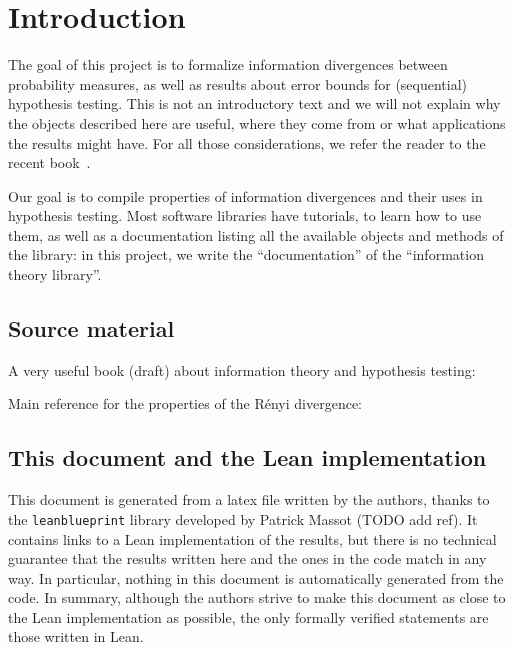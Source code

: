 \chapter*{Introduction}

The goal of this project is to formalize information divergences between probability measures, as well as results about error bounds for (sequential) hypothesis testing.
This is not an introductory text and we will not explain why the objects described here are useful, where they come from or what applications the results might have. For all those considerations, we refer the reader to the recent book~\cite{polyanskiy2024information}.

Our goal is to compile properties of information divergences and their uses in hypothesis testing. Most software libraries have tutorials, to learn how to use them, as well as a documentation listing all the available objects and methods of the library: in this project, we write the ``documentation'' of the ``information theory library''.


\section*{Source material}

A very useful book (draft) about information theory and hypothesis testing: \cite{polyanskiy2024information} 

Main reference for the properties of the Rényi divergence: \cite{van2014renyi}


\section*{This document and the Lean implementation}

This document is generated from a latex file written by the authors, thanks to the \texttt{leanblueprint} library developed by Patrick Massot (TODO add ref). It contains links to a Lean implementation of the results, but there is no technical guarantee that the results written here and the ones in the code match in any way.
In particular, nothing in this document is automatically generated from the code.
In summary, although the authors strive to make this document as close to the Lean implementation as possible, the only formally verified statements are those written in Lean.

